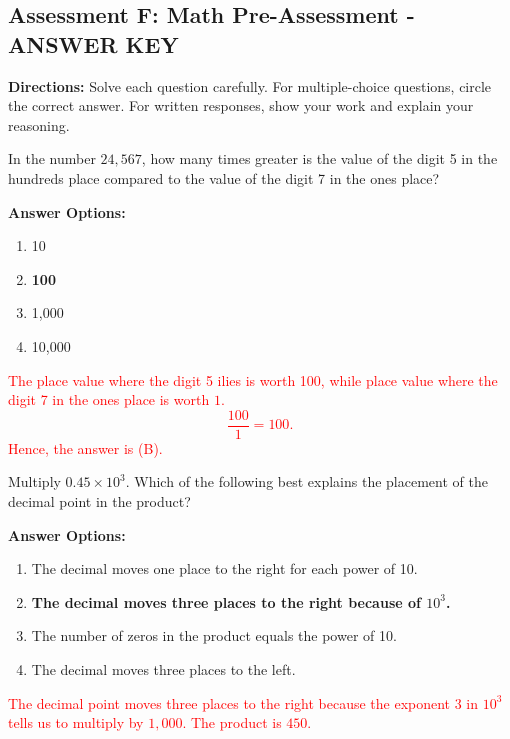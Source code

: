 \documentclass[12pt]{article}
\begin{document}
\subsection*{Assessment F: Math Pre-Assessment - ANSWER KEY}
\onehalfspacing

\begin{tcolorbox}[colframe=black!50, colback=white, title=Assessment Directions]
\textbf{Directions:} Solve each question carefully. For multiple-choice questions, circle the correct answer. For written responses, show your work and explain your reasoning.
\end{tcolorbox}

\begin{tcolorbox}[colframe=black!50, colback=white, title=\textbf{Problem 1 (5.NBT.A.1)}]
In the number \(24,567\), how many times greater is the value of the digit 5 in the hundreds place compared to the value of the digit 7 in the ones place?

\textbf{Answer Options:}
\begin{enumerate}[label=(\Alph*), itemsep=0.5cm]
    \item 10
    \item \textbf{100}
    \item 1,000
    \item 10,000
\end{enumerate}

\textcolor{red}{The place value where the digit 5 ilies is worth 100, while place value where the digit 7 in the ones place is worth \(1\).  
\[
\frac{100}{1} = 100.
\] Hence, the answer is (B).}
\end{tcolorbox}

\begin{tcolorbox}[colframe=black!50, colback=white, title=\textbf{Problem 2 (5.NBT.A.2)}]
Multiply \(0.45 \times 10^3\). Which of the following best explains the placement of the decimal point in the product?  

\textbf{Answer Options:}
\begin{enumerate}[label=(\Alph*), itemsep=0.5cm]
    \item The decimal moves one place to the right for each power of 10.
    \item \textbf{The decimal moves three places to the right because of \(10^3\).}
    \item The number of zeros in the product equals the power of 10.
    \item The decimal moves three places to the left.
\end{enumerate}

\textcolor{red}{The decimal point moves three places to the right because the exponent \(3\) in \(10^3\) tells us to multiply by \(1,000\). The product is \(450\).}
\end{tcolorbox}
\end{document}
